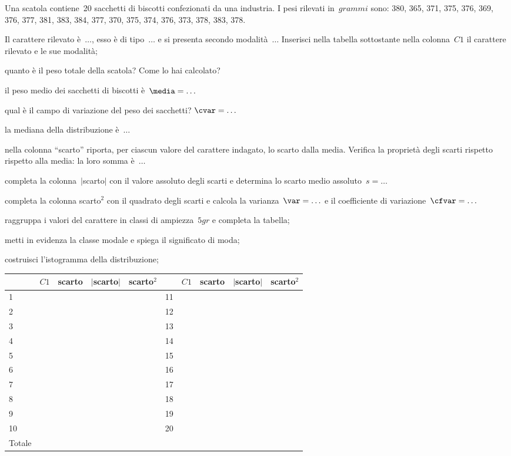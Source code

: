 \begin{esercizio}
\label{ese:A.46}
Una scatola contiene~20 sacchetti di biscotti confezionati da una 
industria. I pesi rilevati in~$\unit{grammi}$ sono:
380, 365, 371, 375, 376, 369, 376, 377, 381, 383, 384, 377, 370, 375, 374, 
376, 373, 378, 383, 378.
\begin{enumeratea}
 \item Il carattere rilevato è~$\ldots$, esso è di tipo~$\ldots$ e si 
presenta secondo modalità~$\ldots$
 Inserisci nella tabella sottostante nella colonna~$C1$ il carattere 
rilevato e le sue modalità;
 \item quanto è il peso totale della scatola? Come lo hai calcolato?
 \item il peso medio dei sacchetti di biscotti è~$\media = \ldots$
 \item qual è il campo di variazione del peso dei sacchetti? $\cvar = 
\ldots$
 \item la mediana della distribuzione è~$\ldots$
 \item nella colonna ``scarto'' riporta, per ciascun valore del carattere 
indagato, lo scarto dalla media.
 Verifica la proprietà degli scarti rispetto rispetto alla media: la loro 
somma è~$\ldots$
 \item completa la colonna~$\vert$scarto$\vert$ con il valore assoluto 
degli scarti e determina lo scarto medio assoluto~$s = \dots$
 \item completa la colonna scarto$^2$ con il quadrato degli scarti e 
calcola la varianza~$\var = \ldots$ e
 il coefficiente di variazione~$\cfvar = \ldots$
 \item raggruppa i valori del carattere in classi di ampiezza~$5 \unit{gr}$ 
e completa la tabella;
 \item metti in evidenza la classe modale e spiega il significato di moda;
 \item costruisci l'istogramma della distribuzione;

\begin{center}
\begin{tabular}{*{2}{lcccc}}
\toprule
 & $C1$ & scarto &$\vert$scarto$\vert$ &scarto$^2$& & $C1$ & scarto 
&$\vert$scarto$\vert$ &scarto$^2$\\
\midrule
1 & & & & &11 & & & &\\
2 & & & & &12 & & & &\\
3 & & & & &13 & & & &\\
4 & & & & &14 & & & &\\
5 & & & & &15 & & & &\\
6 & & & & &16 & & & &\\
7 & & & & &17 & & & &\\
8 & & & & &18 & & & &\\
9 & & & & &19 & & & &\\
10 & & & & &20 & & & &\\
\midrule
Totale & & & &&&&\\
\bottomrule
\end{tabular}
\end{center}


\end{enumeratea}
\end{esercizio}
